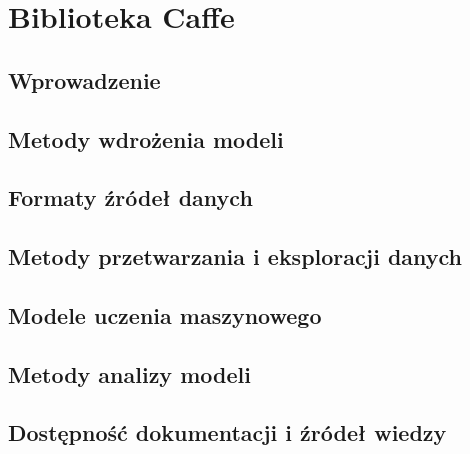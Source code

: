 \chapter{Biblioteka Caffe}

\section{Wprowadzenie}
\section{Metody wdrożenia modeli}
\section{Formaty źródeł danych}
\section{Metody przetwarzania i eksploracji danych}
\section{Modele uczenia maszynowego}
\section{Metody analizy modeli}
\section{Dostępność dokumentacji i źródeł wiedzy}